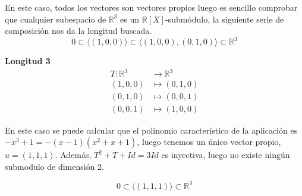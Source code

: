 En este caso, todos los vectores son vectores propios luego es sencillo comprobar que cualquier subespacio de \(\mathbb{R}^3\) es un
\(\mathbb{R}[X]\)-submódulo, la siguiente serie de composición nos da la longitud buscada.
\[
        0 \subset \langle (1,0,0) \rangle \subset \langle (1,0,0), (0,1,0)
        \rangle \subset \mathbb{R}^3
\]

\textbf{Longitud 3}%
\[
\begin{aligned}
  T:\mathbb{R}^3 &\rightarrow \mathbb{R}^3\\
  (1,0,0) &\mapsto (0,1,0)\\
  (0,1,0) &\mapsto (0,0,1)\\
  (0,0,1) &\mapsto (1,0,0)
\end{aligned}
\]

En este caso se puede calcular que el polinomio característico de la aplicación
es \(-x^3 + 1 = -(x-1)(x^2+x+1)\), luego tenemos un único vector propio, \(u = (1,1,1)\). Además, \(T^2 + T +Id = 3Id\) es inyectiva, luego no existe ningún submodulo de dimensión 2.

\[
        0 \subset \langle (1,1,1) \rangle \subset \mathbb{R}^3
\]
